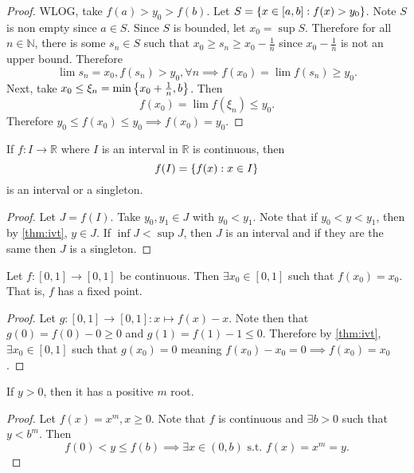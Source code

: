 \documentclass[../notes.tex]{subfiles}
\begin{document}
\begin{proof}
    WLOG, take $f(a) > y_0 > f(b)$. Let $S = \qty{ x \in [a,b] : f(x) > y_0 }$. Note $S$ is non empty since $a \in S$. Since $S$ is bounded, let $x_0 = \sup S$. Therefore for all $n \in \mathbb{N}$, there is some $s_n \in S$ such that $x_0 \geq s_n \geq x_0 - \frac{1}{n}$ since $x_0 - \frac{1}{n}$ is not an upper bound. Therefore
    \[
        \lim s_n = x_0, f(s_n) > y_0, \forall n \implies f(x_0) = \lim f(s_n) \geq y_0
    .\]
    Next, take $x_0 \leq \xi_n = \min\qty{x_0 + \frac{1}{n}, b}$. Then
    \[
        f(x_0) = \lim f(\xi_n) \leq y_0
    .\]
    Therefore $y_0 \leq f(x_0) \leq y_0 \implies f(x_0) = y_0$.
\end{proof}

\begin{corollary}
    If $f : I \to \mathbb{R}$ where $I$ is an interval in $\mathbb{R}$ is continuous, then
    \[
        f(I) = \qty{f(x) : x \in I}
    \]
    is an interval or a singleton.
\end{corollary}
\begin{proof}
    Let $J = f(I)$. Take $y_0, y_1 \in J$ with $y_0 < y_1$. Note that if $y_0 < y < y_1$, then by \ref{thm:ivt}, $y \in J$. If $\inf J < \sup J$, then $J$ is an interval and if they are the same then $J$ is a singleton.
\end{proof}

\begin{example}
    Let $f : [0,1] \to [0,1]$ be continuous. Then $\exists x_0 \in [0,1]$ such that $f(x_0) = x_0$. That is, $f$ has a fixed point.
    \begin{proof}
        Let $g : [0,1] \to [0,1] : x \mapsto f(x) - x$. Note then that $g(0) = f(0) - 0 \geq 0$ and $g(1) = f(1) - 1 \leq 0$. Therefore by \ref{thm:ivt}, $\exists x_0 \in [0,1]$ such that $g(x_0) = 0$ meaning $f(x_0) - x_0 = 0 \implies f(x_0) = x_0$.
    \end{proof}
\end{example}

\begin{example}
    If $y > 0$, then it has a positive $m$ root.
    \begin{proof}
        Let $f(x) = x^m, x \geq 0$. Note that $f$ is continuous and $\exists b > 0$ such that $y < b^m$. Then
        \[
            f(0) < y \leq f(b) \implies \exists x \in (0, b) \text{ s.t. } f(x) = x^m = y
        .\]
    \end{proof}
\end{example}
\end{document}
